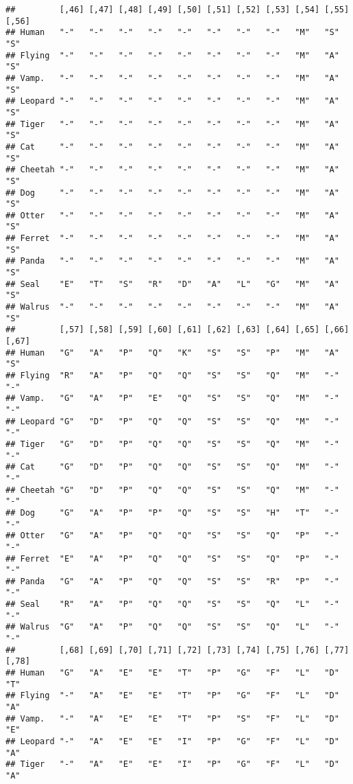 \documentclass[]{article}
\begin{document}
\begin{verbatim}
##         [,46] [,47] [,48] [,49] [,50] [,51] [,52] [,53] [,54] [,55] [,56]
## Human   "-"   "-"   "-"   "-"   "-"   "-"   "-"   "-"   "M"   "S"   "S"  
## Flying  "-"   "-"   "-"   "-"   "-"   "-"   "-"   "-"   "M"   "A"   "S"  
## Vamp.   "-"   "-"   "-"   "-"   "-"   "-"   "-"   "-"   "M"   "A"   "S"  
## Leopard "-"   "-"   "-"   "-"   "-"   "-"   "-"   "-"   "M"   "A"   "S"  
## Tiger   "-"   "-"   "-"   "-"   "-"   "-"   "-"   "-"   "M"   "A"   "S"  
## Cat     "-"   "-"   "-"   "-"   "-"   "-"   "-"   "-"   "M"   "A"   "S"  
## Cheetah "-"   "-"   "-"   "-"   "-"   "-"   "-"   "-"   "M"   "A"   "S"  
## Dog     "-"   "-"   "-"   "-"   "-"   "-"   "-"   "-"   "M"   "A"   "S"  
## Otter   "-"   "-"   "-"   "-"   "-"   "-"   "-"   "-"   "M"   "A"   "S"  
## Ferret  "-"   "-"   "-"   "-"   "-"   "-"   "-"   "-"   "M"   "A"   "S"  
## Panda   "-"   "-"   "-"   "-"   "-"   "-"   "-"   "-"   "M"   "A"   "S"  
## Seal    "E"   "T"   "S"   "R"   "D"   "A"   "L"   "G"   "M"   "A"   "S"  
## Walrus  "-"   "-"   "-"   "-"   "-"   "-"   "-"   "-"   "M"   "A"   "S"  
##         [,57] [,58] [,59] [,60] [,61] [,62] [,63] [,64] [,65] [,66] [,67]
## Human   "G"   "A"   "P"   "Q"   "K"   "S"   "S"   "P"   "M"   "A"   "S"  
## Flying  "R"   "A"   "P"   "Q"   "Q"   "S"   "S"   "Q"   "M"   "-"   "-"  
## Vamp.   "G"   "A"   "P"   "E"   "Q"   "S"   "S"   "Q"   "M"   "-"   "-"  
## Leopard "G"   "D"   "P"   "Q"   "Q"   "S"   "S"   "Q"   "M"   "-"   "-"  
## Tiger   "G"   "D"   "P"   "Q"   "Q"   "S"   "S"   "Q"   "M"   "-"   "-"  
## Cat     "G"   "D"   "P"   "Q"   "Q"   "S"   "S"   "Q"   "M"   "-"   "-"  
## Cheetah "G"   "D"   "P"   "Q"   "Q"   "S"   "S"   "Q"   "M"   "-"   "-"  
## Dog     "G"   "A"   "P"   "P"   "Q"   "S"   "S"   "H"   "T"   "-"   "-"  
## Otter   "G"   "A"   "P"   "Q"   "Q"   "S"   "S"   "Q"   "P"   "-"   "-"  
## Ferret  "E"   "A"   "P"   "Q"   "Q"   "S"   "S"   "Q"   "P"   "-"   "-"  
## Panda   "G"   "A"   "P"   "Q"   "Q"   "S"   "S"   "R"   "P"   "-"   "-"  
## Seal    "R"   "A"   "P"   "Q"   "Q"   "S"   "S"   "Q"   "L"   "-"   "-"  
## Walrus  "G"   "A"   "P"   "Q"   "Q"   "S"   "S"   "Q"   "L"   "-"   "-"  
##         [,68] [,69] [,70] [,71] [,72] [,73] [,74] [,75] [,76] [,77] [,78]
## Human   "G"   "A"   "E"   "E"   "T"   "P"   "G"   "F"   "L"   "D"   "T"  
## Flying  "-"   "A"   "E"   "E"   "T"   "P"   "G"   "F"   "L"   "D"   "A"  
## Vamp.   "-"   "A"   "E"   "E"   "T"   "P"   "S"   "F"   "L"   "D"   "E"  
## Leopard "-"   "A"   "E"   "E"   "I"   "P"   "G"   "F"   "L"   "D"   "A"  
## Tiger   "-"   "A"   "E"   "E"   "I"   "P"   "G"   "F"   "L"   "D"   "A"  

\end{verbatim}
\end{document}
